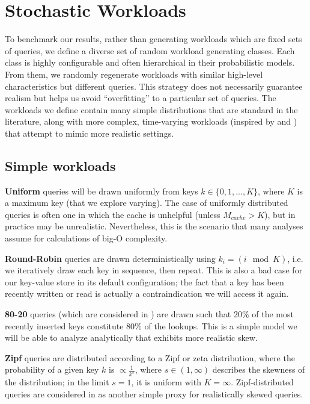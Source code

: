 \documentclass{sig-alternate-05-2015}
\begin{document}
\section{Stochastic Workloads}

To benchmark our results, rather than generating workloads which are fixed sets
of queries, we define a diverse set of random workload generating classes.
Each class is highly configurable and often hierarchical in their probabilistic
models.  From them, we randomly regenerate workloads with similar high-level
characteristics but different queries. This strategy does not necessarily
guarantee realism but helps us avoid ``overfitting'' to a particular set of
queries. The workloads we define contain many simple distributions that are
standard in the literature, along with more complex, time-varying workloads
(inspired by \cite{characterizing-memcached} and \cite{linkbench}) that attempt
to mimic more realistic settings.

\subsection{Simple workloads}

\textbf{Uniform} queries will be drawn uniformly from keys $k \in
\{0,1,...,K\}$, where $K$ is a maximum key (that we explore varying).
The case of uniformly distributed queries is often one in
which the cache is unhelpful (unless $M_{cache} > K$), but in practice may be
unrealistic. Nevertheless, this is the scenario that many analyses assume for
calculations of big-O complexity.

\textbf{Round-Robin} queries are drawn deterministically using $k_i = (i \mod
K)$, i.e. we iteratively draw each key in sequence, then repeat.
This is also a bad case for our key-value store in its default configuration;
the fact that a key has been recently written or read is actually a
contraindication we will access it again.

\textbf{80-20} queries (which are considered in \cite{monkey}) are drawn such
that 20\% of the most recently inserted keys constitute 80\% of the lookups.
This is a simple model we will be able to analyze analytically that exhibits
more realistic skew.

\textbf{Zipf} queries are distributed according to a Zipf or zeta distribution,
where the probability of a given key $k$ is $\propto \frac{1}{k^s}$, where $s
\in (1, \infty)$ describes the skewness of the distribution; in the limit
$s=1$, it is uniform with $K=\infty$. Zipf-distributed queries are considered
in \cite{art} as another simple proxy for realistically skewed queries.
\end{document}

